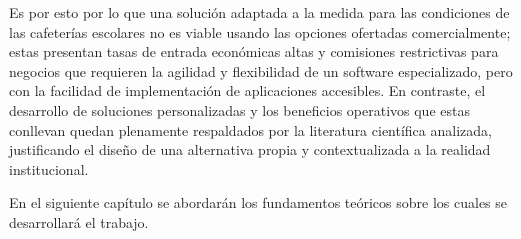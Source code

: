 Es por esto por lo que una solución adaptada a la medida para las condiciones de las cafeterías escolares no es viable usando las opciones ofertadas comercialmente; estas presentan tasas de entrada económicas altas y comisiones restrictivas para negocios que requieren la agilidad y flexibilidad de un software especializado, pero con la facilidad de implementación de aplicaciones accesibles. En contraste, el desarrollo de soluciones personalizadas y los beneficios operativos que estas conllevan quedan plenamente respaldados por la literatura científica analizada, justificando el diseño de una alternativa propia y contextualizada a la realidad institucional.  

En el siguiente capítulo se abordarán los fundamentos teóricos sobre los cuales se desarrollará el trabajo. 